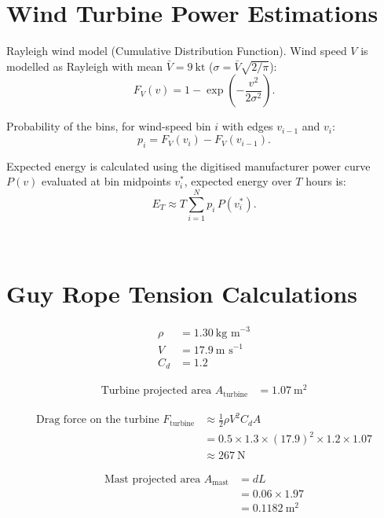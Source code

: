 \documentclass[11pt,a4paper]{article}
\begin{document}
\section{Wind Turbine Power Estimations}

Rayleigh wind model (Cumulative Distribution Function). Wind speed \(V\) is modelled as Rayleigh with mean \(\bar{V}=9~\mathrm{kt}\) (\(\sigma=\bar{V}\sqrt{2/\pi}\)):
\begin{equation}
F_V(v)=1-\exp\!\left(-\frac{v^2}{2\sigma^2}\right).
\end{equation}

Probability of the bins, for wind-speed bin \(i\) with edges \(v_{i-1}\) and \(v_i\):
\begin{equation}
p_i = F_V(v_i)-F_V(v_{i-1}).
\end{equation}

Expected energy is calculated using the digitised manufacturer power curve \(P(v)\) evaluated at bin midpoints \(v_i^\ast\), expected energy over \(T\) hours is:
\begin{equation}
E_T \approx T\sum_{i=1}^{N} p_i\,P(v_i^\ast).
\end{equation}

\
\section{Guy Rope Tension Calculations}

\begin{align}
\rho &= 1.30 \ \text{kg m}^{-3} \\
V &= 17.9 \ \text{m s}^{-1} \\
C_d &= 1.2
\end{align}

\begin{align}
\text{Turbine projected area }
A_{\text{turbine}} &= 1.07 \ \text{m}^2
\end{align}

\begin{align}
\text{Drag force on the turbine }
F_{\text{turbine}} &\approx \frac{1}{2} \rho V^2 C_d A \\
&= 0.5 \times 1.3 \times (17.9)^2 \times 1.2 \times 1.07 \\
&\approx 267 \ \text{N}
\end{align}

\begin{align}
\text{Mast projected area }
A_{\text{mast}} &= dL \\
&= 0.06 \times 1.97 \\
&= 0.1182 \ \text{m}^2
\end{align}
\end{document}
